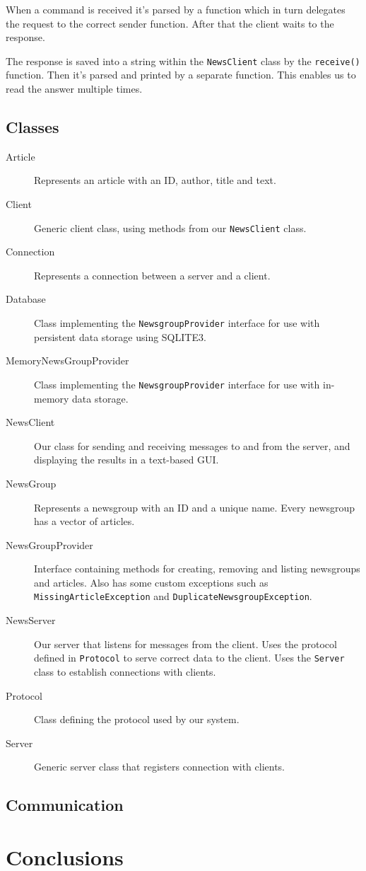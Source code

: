\documentclass[12pt]{article}
\begin{document}
When a command is received it's parsed by a function which in turn delegates the request to the correct sender function. After that the client waits to the response.

The response is saved into a string within the \verb!NewsClient! class by the \verb!receive()! function. Then it's parsed and printed by a separate function. This enables us to read the answer multiple times.

\subsection{Classes}
\begin{description}
\item[Article] Represents an article with an ID, author, title and text.
\item[Client] Generic client class, using methods from our \verb!NewsClient! class.
\item[Connection] Represents a connection between a server and a client.
\item[Database] Class implementing the \verb!NewsgroupProvider! interface for use with persistent data storage using SQLITE3.
\item[MemoryNewsGroupProvider] Class implementing the \verb!NewsgroupProvider! interface for use with in-memory data storage.
\item[NewsClient] Our class for sending and receiving messages to and from the server, and displaying the results in a text-based GUI. 
\item[NewsGroup] Represents a newsgroup with an ID and a unique name. Every newsgroup has a vector of articles.
\item[NewsGroupProvider] Interface containing methods for creating, removing and listing newsgroups and articles. Also has some custom exceptions such as \verb!MissingArticleException! and \verb!DuplicateNewsgroupException!.
\item[NewsServer] Our server that listens for messages from the client. Uses the protocol defined in \verb!Protocol! to serve correct data to the client. Uses the \verb!Server! class to establish connections with clients.
\item[Protocol] Class defining the protocol used by our system.
\item[Server] Generic server class that registers connection with clients.
\end{description}
\subsection{Communication}

\section{Conclusions}
\end{document}
